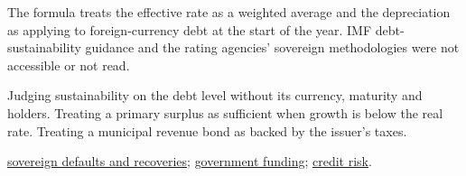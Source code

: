 \begin{qfmethod}
 The formula treats the effective rate as a weighted average and the depreciation as applying to foreign-currency debt at the start of the year. IMF debt-sustainability guidance and the rating agencies' sovereign methodologies were not accessible or not read.

 Judging sustainability on the debt level without its currency, maturity and holders. Treating a primary surplus as sufficient when growth is below the real rate. Treating a municipal revenue bond as backed by the issuer's taxes.

 \hyperref[def:sovereign-credit-defaults]{sovereign defaults and recoveries}; \hyperref[def:government-agency-supranational-funding]{government funding}; \hyperref[def:credit-risk-components]{credit risk}.

\end{qfmethod}
